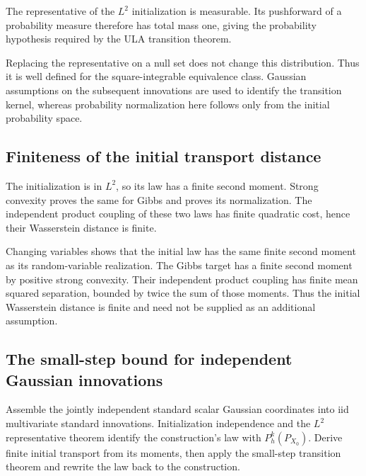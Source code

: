 \documentclass[11pt,a4paper]{report}
\begin{document}
The representative of the \(L^2\) initialization is measurable. Its pushforward of a probability measure therefore has total mass one, giving the probability hypothesis required by the ULA transition theorem.



Replacing the representative on a null set does not change this distribution. Thus it is well defined for the square-integrable equivalence class. Gaussian assumptions on the subsequent innovations are used to identify the transition kernel, whereas probability normalization here follows only from the initial probability space.

\subsection{\texorpdfstring{Finiteness of the initial transport distance}{Finiteness of the initial transport distance}}
\label{report-step-UnadjustedLangevin-GaussianULA-lean-2}


The initialization is in \(L^2\), so its law has a finite second moment. Strong convexity proves the same for Gibbs and proves its normalization. The independent product coupling of these two laws has finite quadratic cost, hence their Wasserstein distance is finite.



Changing variables shows that the initial law has the same finite second moment as its random-variable realization. The Gibbs target has a finite second moment by positive strong convexity. Their independent product coupling has finite mean squared separation, bounded by twice the sum of those moments. Thus the initial Wasserstein distance is finite and need not be supplied as an additional assumption.

\subsection{\texorpdfstring{The small-step bound for independent Gaussian innovations}{The small-step bound for independent Gaussian innovations}}
\label{report-step-UnadjustedLangevin-GaussianULA-lean-3}


Assemble the jointly independent standard scalar Gaussian coordinates into iid multivariate standard innovations. Initialization independence and the \(L^2\) representative theorem identify the construction's law with \(P_h^k(P_{X_0})\). Derive finite initial transport from its moments, then apply the small-step transition theorem and rewrite the law back to the construction.
\end{document}

